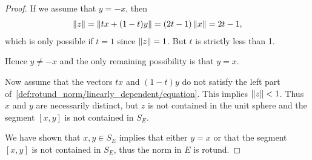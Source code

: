 \begin{proof}
  If we assume that $y = -x$, then
  \begin{align*}
    \left\Vert z \right\Vert
    =
    \left\Vert tx + (1-t)y \right\Vert
    =
    (2t - 1) \left\Vert x \right\Vert
    =
    2t - 1,
  \end{align*}
  which is only possible if $t = 1$ since $\left\Vert z \right\Vert = 1$. But $t$ is strictly less than 1.

  Hence $y \neq -x$ and the only remaining possibility is that $y = x$.

  Now assume that the vectors $tx$ and $(1-t)y$ do not satisfy the left part of~\cref{def:rotund_norm/linearly_dependent/equation}. This implies $\left\Vert z \right\Vert < 1$. Thus $x$ and $y$ are necessarily distinct, but $z$ is not contained in the unit sphere and the segment $[x, y]$ is not contained in $S_E$.

  We have shown that $x, y \in S_E$ implies that either $y = x$ or that the segment $[x, y]$ is not contained in $S_E$, thus the norm in $E$ is rotund.
\end{proof}

